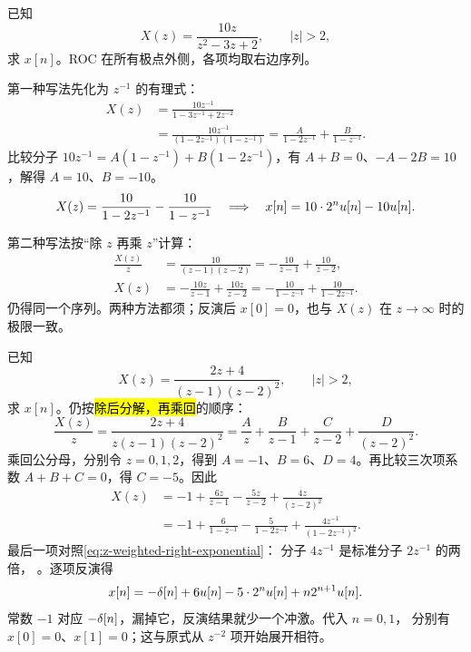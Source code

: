 \begin{example}[两种部分分式写法]
\label{eg:z-inverse-two-methods}
  已知
  \[
    X(z)=\frac{10z}{z^2-3z+2},\qquad |z|>2,
  \]
  求 $x[n]$。ROC 在所有极点外侧，各项均取右边序列。

  第一种写法先化为 $z^{-1}$ 的有理式：
  \begin{align*}
    X(z)&=\frac{10z^{-1}}{1-3z^{-1}+2z^{-2}}\\
      &=\frac{10z^{-1}}{(1-2z^{-1})(1-z^{-1})}
        =\frac{A}{1-2z^{-1}}+\frac{B}{1-z^{-1}}.
  \end{align*}
  比较分子 $10z^{-1}=A(1-z^{-1})+B(1-2z^{-1})$，有
  $A+B=0$、$-A-2B=10$，解得 $A=10$、$B=-10$。
  \[
    X(z)=\frac{10}{1-2z^{-1}}-\frac{10}{1-z^{-1}}
    \quad\Longrightarrow\quad
    x[n]=10\cdot2^nu[n]-10u[n].
  \]

  第二种写法按“除 $z$ 再乘 $z$”计算：
  \begin{align*}
    \frac{X(z)}z
      &=\frac{10}{(z-1)(z-2)}
        =-\frac{10}{z-1}+\frac{10}{z-2},\\
    X(z)&=-\frac{10z}{z-1}+\frac{10z}{z-2}
      =-\frac{10}{1-z^{-1}}+\frac{10}{1-2z^{-1}}.
  \end{align*}
  仍得同一个序列。两种方法都须；反演后
  $x[0]=0$，也与 $X(z)$ 在 $z\to\infty$ 时的极限一致。
\end{example}

\begin{example}[含重复极点的反演]
\label{eg:z-inverse-repeated-pole}
  已知
  \[
    X(z)=\frac{2z+4}{(z-1)(z-2)^2},\qquad |z|>2,
  \]
  求 $x[n]$。仍按\hl{除后分解，再乘回}的顺序：
  \[
    \frac{X(z)}z
      =\frac{2z+4}{z(z-1)(z-2)^2}
      =\frac{A}{z}+\frac{B}{z-1}
       +\frac{C}{z-2}+\frac{D}{(z-2)^2}.
  \]
  乘回公分母，分别令 $z=0,1,2$，得到
  $A=-1$、$B=6$、$D=4$。再比较三次项系数
  $A+B+C=0$，得 $C=-5$。因此
  \begin{align*}
    X(z)&=-1+\frac{6z}{z-1}-\frac{5z}{z-2}
              +\frac{4z}{(z-2)^2}\\
      &=-1+\frac{6}{1-z^{-1}}-\frac{5}{1-2z^{-1}}
              +\frac{4z^{-1}}{(1-2z^{-1})^2}.
  \end{align*}
  最后一项对照\cref{eq:z-weighted-right-exponential}：
  分子 $4z^{-1}$ 是标准分子 $2z^{-1}$ 的两倍，
  。逐项反演得
  \[
    x[n]=-\delta[n]+6u[n]-5\cdot2^nu[n]
            +n2^{n+1}u[n].
  \]
  常数 $-1$ 对应 $-\delta[n]$，漏掉它，反演结果就少一个冲激。代入 $n=0,1$，
  分别有 $x[0]=0$、$x[1]=0$；这与原式从 $z^{-2}$ 项开始展开相符。
\end{example}

